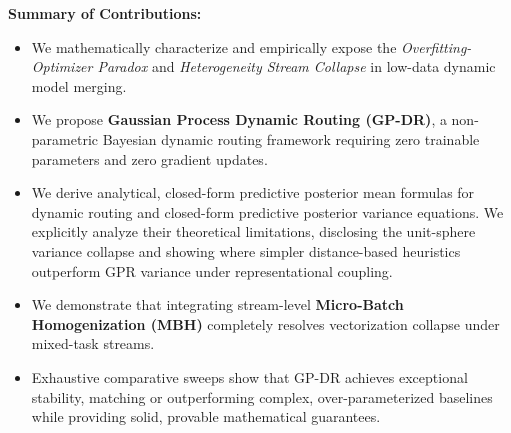 \textbf{Summary of Contributions:}
\begin{itemize}
    \item We mathematically characterize and empirically expose the \emph{Overfitting-Optimizer Paradox} and \emph{Heterogeneity Stream Collapse} in low-data dynamic model merging.
    \item We propose \textbf{Gaussian Process Dynamic Routing (GP-DR)}, a non-parametric Bayesian dynamic routing framework requiring zero trainable parameters and zero gradient updates.
    \item We derive analytical, closed-form predictive posterior mean formulas for dynamic routing and closed-form predictive posterior variance equations. We explicitly analyze their theoretical limitations, disclosing the unit-sphere variance collapse and showing where simpler distance-based heuristics outperform GPR variance under representational coupling.
    \item We demonstrate that integrating stream-level \textbf{Micro-Batch Homogenization (MBH)} completely resolves vectorization collapse under mixed-task streams.
    \item Exhaustive comparative sweeps show that GP-DR achieves exceptional stability, matching or outperforming complex, over-parameterized baselines while providing solid, provable mathematical guarantees.
\end{itemize}